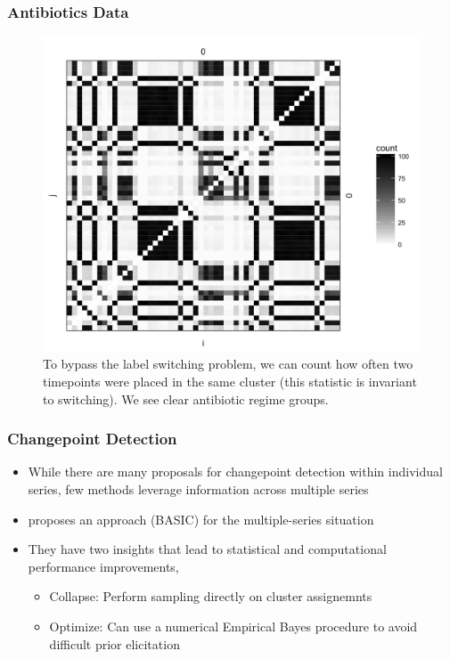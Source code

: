 \documentclass{beamer}
\begin{document}
\begin{frame}
\begin{frame}
\begin{frame}
  \frametitle{Antibiotics Data}
\begin{figure}[ht]
  \centering
  \includegraphics[width=\textwidth]{figure/abt_cooccurrence}
  \caption{To bypass the label switching problem, we can count how often two
    timepoints were placed in the same cluster (this statistic is invariant to
    switching). We see clear antibiotic regime groups. \label{afig:abt_states}}
\end{figure}
\end{frame}

\begin{frame}
  \frametitle{Changepoint Detection}
  \begin{itemize}
  \item While there are many proposals for changepoint detection within
    individual series, few methods leverage information across multiple series
  \item \citep{fan2015empirical} proposes an approach (BASIC) for the
    multiple-series situation
  \item They have two insights that lead to statistical and computational
    performance improvements,
    \begin{itemize}
    \item Collapse: Perform sampling directly on cluster assignemnts
    \item Optimize: Can use a numerical Empirical Bayes procedure to avoid
      difficult prior elicitation
    \end{itemize}
  \end{itemize}
\end{frame}


\end{frame}
\end{frame}
\end{document}
